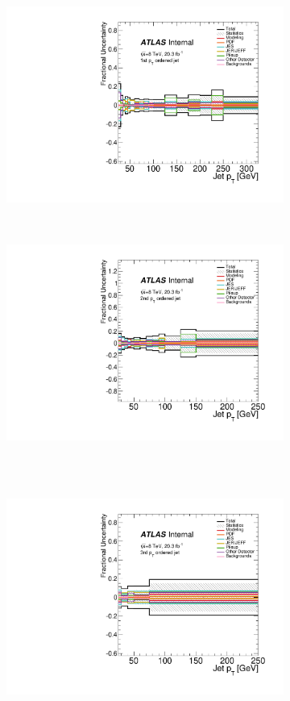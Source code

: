 \begin{figure}
\begin{subfigure}[]{0.45\textwidth}
\includegraphics[width=\textwidth]{fig/UnfoldSys/Jet0.pdf}
\end{subfigure}
~
\begin{subfigure}[]{0.45\textwidth}
\includegraphics[width=\textwidth]{fig/UnfoldSys/Jet1.pdf}
\end{subfigure} \\
~
\begin{subfigure}[]{0.45\textwidth}
\includegraphics[width=\textwidth]{fig/UnfoldSys/Jet2.pdf}

\end{subfigure}
\end{figure}
